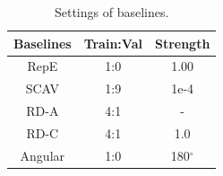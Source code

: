 \documentclass{article}
\theoremstyle{plain}
\theoremstyle{definition}
\theoremstyle{remark}
\begin{document}
\begin{table}[!t]
	\centering
	\caption{Settings of baselines.}\label{tab:baseline}
	\begin{tabular}{@{}ccc@{}}
		\toprule
		Baselines & Train:Val & Strength \\ \midrule
		RepE      & 1:0       & 1.00     \\
		SCAV      & 1:9       & 1e-4     \\
		RD-A      & 4:1       & -        \\
		RD-C      & 4:1       & 1.0      \\
		Angular   & 1:0       & 180$^\circ$     \\ \bottomrule
	\end{tabular}
\end{table}


\end{document}
